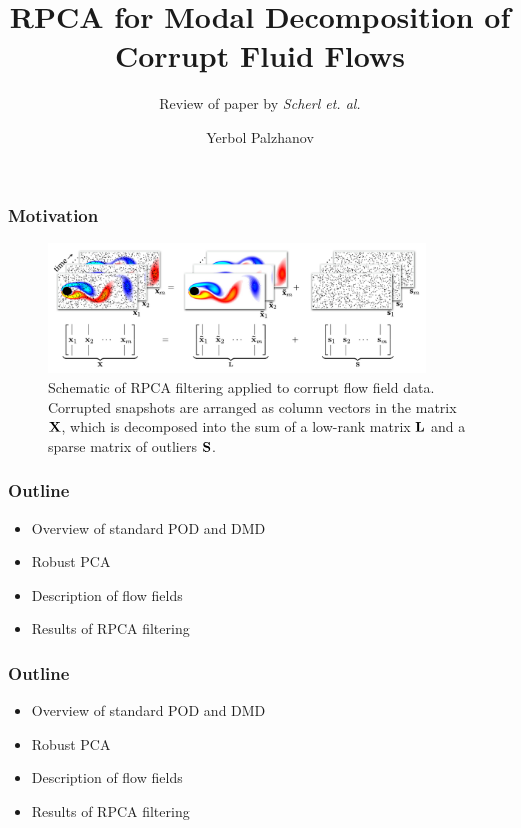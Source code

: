 \documentclass[12pt]{beamer}
\begin{document}
	\author{Yerbol Palzhanov}
	\title[MATH 6397]{RPCA for Modal Decomposition of Corrupt Fluid Flows}
	\subtitle{Review of paper by \textit{Scherl et. al.}  }
	\begin{frame}[plain]
		\maketitle
	\end{frame}
	
	\begin{frame}
		\frametitle{Motivation}
		\begin{figure}
		\begin{center}
			\includegraphics[width=10cm]{./figures/fig01schematic.png}
			\caption{Schematic of RPCA filtering applied to corrupt flow field data.  Corrupted snapshots are arranged as column vectors in the matrix ${\bf X}$, which is decomposed into the sum of a low-rank matrix ${\bf L}$ and a sparse matrix of outliers ${\bf S}$.}
		\end{center}
		\end{figure}
	\end{frame}

	\begin{frame}
	\frametitle{Outline}
	\begin{itemize}
		\item Overview of standard POD and DMD
		\item Robust PCA
		\item Description of flow fields
		\item Results of RPCA filtering
	\end{itemize}
	\end{frame}



	\begin{frame}
		\frametitle{Outline}
		\begin{itemize}
			\item {\color{red}Overview of standard POD and DMD}
			\item Robust PCA
			\item Description of flow fields
			\item Results of RPCA filtering
		\end{itemize}
	\end{frame}
\end{document}
